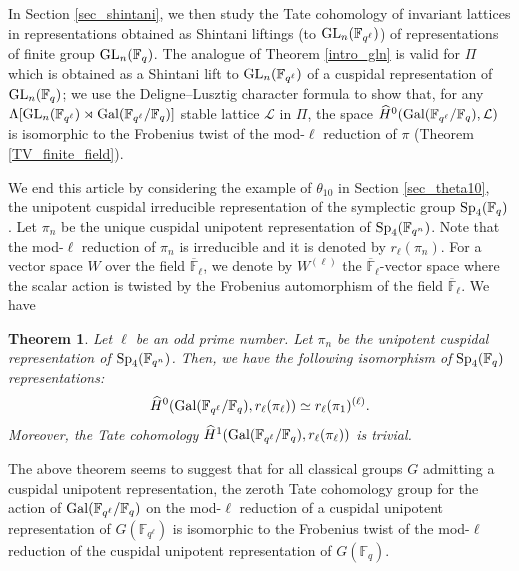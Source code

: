\documentclass[10pt, reqno]{amsart}
\theoremstyle{plain}
\numberwithin{equation}{section} \newcommand{\di}{\operatorname{dim}}
\newtheorem{theorem}{Theorem}[subsection]
\begin{document}
In Section \ref{sec_shintani}, we then study the Tate cohomology of
invariant lattices in representations obtained as Shintani liftings
(to ${\rm GL}_n(\mathbb{F}_{q^\ell})$) of representations of finite
group ${\rm GL}_n(\mathbb{F}_q)$.  The analogue of Theorem
\ref{intro_gln} is valid for $\Pi$ which is obtained as a Shintani
lift to ${\rm GL}_n(\mathbb{F}_{q^\ell})$ of a cuspidal representation
of ${\rm GL}_n(\mathbb{F}_q)$; we use the Deligne--Lusztig character
formula to show that, for any
$\Lambda[{\rm GL}_n(\mathbb{F}_{q^\ell})\rtimes{\rm
  Gal}(\mathbb{F}_{q^\ell}/\mathbb{F}_q)]$ stable lattice
$\mathcal{L}$ in $\Pi$, the space
$\widehat{H}^0({\rm Gal}(\mathbb{F}_{q^{\ell}}/\mathbb{F}_q),
\mathcal{L})$ is isomorphic to the Frobenius twist of the mod-$\ell$
reduction of $\pi$ (Theorem \ref{TV_finite_field}).

We end this article by considering the example of $\theta_{10}$ in
Section \ref{sec_theta10}, the unipotent cuspidal irreducible
representation of the symplectic group ${\rm
  Sp}_4(\mathbb{F}_{q})$. Let $\pi_{n}$ be the unique cuspidal
unipotent representation of ${\rm Sp}_4(\mathbb{F}_{q^n})$. Note that
the mod-$\ell$ reduction of $\pi_n$ is irreducible and it is denoted
by $r_\ell(\pi_n)$.  For a vector space $W$ over the field
$\overline{\mathbb{F}}_\ell$, we denote by $W^{(\ell)}$ the
$\overline{\mathbb{F}}_\ell$-vector space where the scalar action is
twisted by the Frobenius automorphism of the field
$\overline{\mathbb{F}}_\ell$. We have
\begin{theorem}
Let $\ell$ be an odd prime number. 
Let $\pi_n$ be the unipotent cuspidal representation of ${\rm
Sp}_4(\mathbb{F}_{q^n})$. Then, we have the following isomorphism of
${\rm Sp}_4(\mathbb{F}_q)$ representations:
$$\widehat{H}^0({\rm
Gal}(\mathbb{F}_{q^\ell}/\mathbb{F}_q),
r_\ell(\pi_\ell))\simeq r_\ell(\pi_1)^{(\ell)}.$$
Moreover, the Tate cohomology $\widehat{H}^1({\rm
Gal}(\mathbb{F}_{q^\ell}/\mathbb{F}_q), 
r_\ell(\pi_\ell))$ is
trivial. 
\end{theorem}
The above theorem seems to suggest that 
for all classical groups $G$ admitting a cuspidal
unipotent representation, the zeroth Tate cohomology group for the
action of ${\rm Gal}(\mathbb{F}_{q^\ell}/\mathbb{F}_q)$ on the
mod-$\ell$ reduction of a cuspidal unipotent representation of
$G(\mathbb{F}_{q^\ell})$ is isomorphic to the Frobenius twist of the
mod-$\ell$ reduction of the cuspidal unipotent representation of
$G(\mathbb{F}_q)$. 
\end{document}
